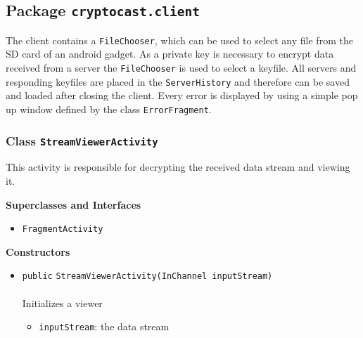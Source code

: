 \subsection{Package \lstinline!cryptocast.client!}
The client contains a \lstinline|FileChooser|, which can be used to select any file from the SD card 
 of an android gadget. As a private key is necessary to encrypt data received from a server the 
 \lstinline|FileChooser| is used to select a keyfile. All servers and responding keyfiles are placed 
 in the \lstinline|ServerHistory| and therefore can be saved and loaded after closing the client.
 Every error is displayed by using a simple pop up window defined by the class \lstinline|ErrorFragment|.

\subsubsection{Class \lstinline|StreamViewerActivity|}
This activity is responsible for decrypting the received data
 stream and viewing it. \\
\noindent\begin{minipage}[t]{5cm}
\vspace{0.3em}
\hspace*{2em}
\vspace{0.3em}
\end{minipage}



\textbf{\sffamily Superclasses and Interfaces}
\begin{itemize}
\item \lstinline|FragmentActivity|
\end{itemize}


\textbf{\sffamily Constructors}
\begin{itemize}
\item \lstinline|public| \lstinline|StreamViewerActivity|\lstinline|(InChannel inputStream)|\\ \\[-0.6em]
Initializes a viewer
\begin{itemize}
\item \lstinline|inputStream|: the data stream
\end{itemize}



\end{itemize}



